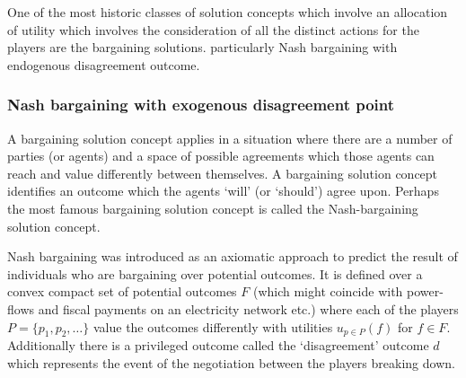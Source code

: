 One of the most historic classes of solution concepts which involve an allocation of utility which involves the consideration of all the distinct actions for the players are the bargaining solutions.
particularly Nash bargaining with endogenous disagreement outcome.

\subsubsection{Nash bargaining with exogenous disagreement point}\label{sec:nash_bargaining_exogenous}

A bargaining solution concept applies in a situation where there are a number of parties (or agents) and a space of possible agreements which those agents can reach and value differently between themselves.
A bargaining solution concept identifies an outcome which the agents `will' (or `should') agree upon.
Perhaps the most famous bargaining solution concept is called the Nash-bargaining solution concept.

Nash bargaining was introduced \cite{nash1} as an axiomatic approach to predict the result of individuals who are bargaining over potential outcomes.
It is defined over a convex compact set of potential outcomes $F$ (which might coincide with power-flows and fiscal payments on an electricity network etc.) 
where each of the players $P=\{p_1,p_2,\dots\}$ value the outcomes differently with utilities $u_{p\in P}(f)$ for $f\in F$.
Additionally there is a privileged outcome called the `disagreement' outcome $d$ which represents the event of the negotiation between the players breaking down.

